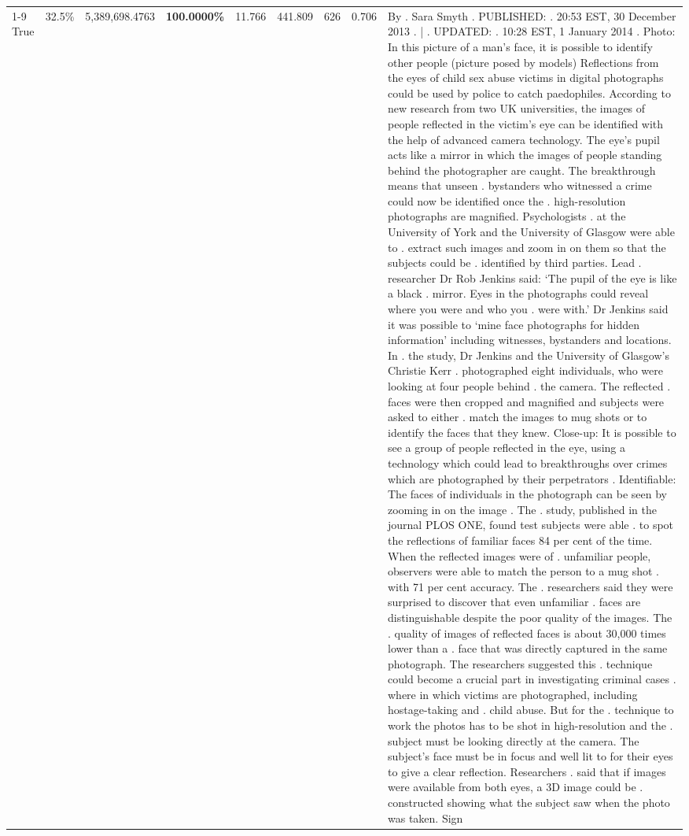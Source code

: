 \begin{table}[H]
\begin{tabular}{lllrlllll}
\cline{1-9}
True & 32.5\% & 5,389,698.4763 & \bfseries \color{red} 100.0000\% & 11.766 & 441.809 & 626 & 0.706 & By . Sara Smyth . PUBLISHED: . 20:53 EST, 30 December 2013 . | . UPDATED: . 10:28 EST, 1 January 2014 . Photo: In this picture of a man's face, it is possible to identify other people (picture posed by models) Reflections from the eyes of child sex abuse victims in digital photographs could be used by police to catch paedophiles. According to new research from two UK universities, the images of people reflected in the victim's eye can be identified with the help of advanced camera technology. The eye's pupil acts like a mirror in which the images of people standing behind the photographer are caught. The breakthrough means that unseen . bystanders who witnessed a crime could now be identified once the . high-resolution photographs are magnified. Psychologists . at the University of York and the University of Glasgow were able to . extract such images and zoom in on them so that the subjects could be . identified by third parties. Lead . researcher Dr Rob Jenkins said: ‘The pupil of the eye is like a black . mirror. Eyes in the photographs could reveal where you were and who you . were with.' Dr Jenkins said it was possible to ‘mine face photographs for hidden information' including witnesses, bystanders and locations. In . the study, Dr Jenkins and the University of Glasgow's Christie Kerr . photographed eight individuals, who were looking at four people behind . the camera. The reflected . faces were then cropped and magnified and subjects were asked to either . match the images to mug shots or to identify the faces that they knew. Close-up: It is possible to see a group of people reflected in the eye, using a technology which could lead to breakthroughs over crimes which are photographed by their perpetrators . Identifiable: The faces of individuals in the photograph can be seen by zooming in on the image . The . study, published in the journal PLOS ONE, found test subjects were able . to spot the reflections of familiar faces 84 per cent of the time. When the reflected images were of . unfamiliar people, observers were able to match the person to a mug shot . with 71 per cent accuracy. The . researchers said they were surprised to discover that even unfamiliar . faces are distinguishable despite the poor quality of the images. The . quality of images of reflected faces is about 30,000 times lower than a . face that was directly captured in the same photograph. The researchers suggested this . technique could become a crucial part in investigating criminal cases . where in which victims are photographed, including hostage-taking and . child abuse. But for the . technique to work the photos has to be shot in high-resolution and the . subject must be looking directly at the camera. The subject's face must be in focus and well lit to for their eyes to give a clear reflection. Researchers . said that if images were available from both eyes, a 3D image could be . constructed showing what the subject saw when the photo was taken. Sign \\

\end{tabular}
\end{table}
